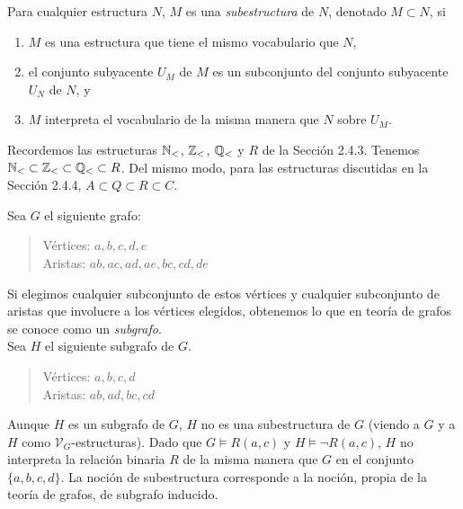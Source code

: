 \message{ !name(main.tex)}\documentclass[12pt,a4paper]{book}
\newcommand{\VV}{\mathcal{V}}
\begin{document}
    \begin{definicion}[Subestructura]\label{def:subestructura}
        Para cualquier estructura $N$, $M$ es una \textit{subestructura} de $N$, denotado $M\subset N$, si
        \begin{enumerate}
            \item[1.] $M$ es una estructura que tiene el mismo vocabulario que $N$,
            \item[2.] el conjunto subyacente $U_{M}$ de $M$ es un subconjunto del conjunto subyacente $U_{N}$ de $N$, y
            \item[3.] $M$ interpreta el vocabulario de la misma manera que $N$ sobre $U_{M}$.
        \end{enumerate}
    \end{definicion}

    \begin{ejemplo}
        Recordemos las estructuras $\mathbb{N}_{<}$, $\mathbb{Z}_{<}$, $\mathbb{Q}_{<}$ y $R$ de la Sección 2.4.3. Tenemos
        $\mathbb{N}_{<}\subset\mathbb{Z}_{<}\subset\mathbb{Q}_{<}\subset R$. Del mismo modo, para las estructuras discutidas en la Sección 2.4.4,
        $A\subset Q\subset R\subset C$.
    \end{ejemplo}

    \begin{ejemplo}\label{ej:subgrafo-no-subestructura}
        Sea $G$ el siguiente grafo:

        \begin{quote}
            Vértices: $a,b,c,d,e$\\
            Aristas: $ab,ac,ad,ae,bc,cd,de$
        \end{quote}

        Si elegimos cualquier subconjunto de estos vértices y cualquier subconjunto de aristas que involucre a los vértices
        elegidos, obtenemos lo que en teoría de grafos se conoce como un \textit{subgrafo}.\\
        Sea $H$ el siguiente subgrafo de $G$.

        \begin{quote}
            Vértices: $a,b,c,d$\\
            Aristas: $ab,ad,bc,cd$
        \end{quote}

        Aunque $H$ es un subgrafo de $G$, $H$ no es una subestructura de $G$ (viendo a $G$ y a $H$ como
        $\VV_{G}$-estructuras). Dado que $G\models R(a,c)$ y $H\models\neg R(a,c)$, $H$ no interpreta la relación binaria
        $R$ de la misma manera que $G$ en el conjunto $\{a,b,c,d\}$. La noción de subestructura corresponde a la noción,
        propia de la teoría de grafos, de subgrafo inducido.
    \end{ejemplo}
\end{document}
